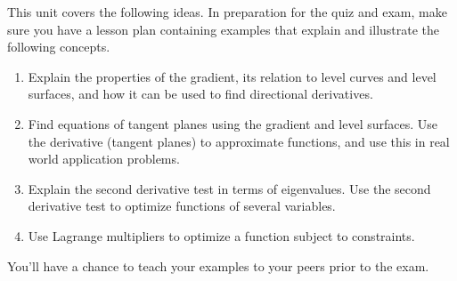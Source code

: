 
\noindent 
This unit covers the following ideas. In preparation for the quiz and exam, make sure you have a lesson plan containing examples that explain and illustrate the following concepts.  
\begin{enumerate}
\item Explain the properties of the gradient, its relation to level curves and level surfaces, and how it can be used to find directional derivatives.
\item Find equations of tangent planes using the gradient and level surfaces. Use the derivative (tangent planes) to approximate functions, and use this in real world application problems.
\item Explain the second derivative test in terms of eigenvalues. Use the second derivative test to optimize functions of several variables.
\item Use Lagrange multipliers to optimize a function subject to constraints. %
\end{enumerate}
You'll have a chance to teach your examples to your peers prior to the exam.


